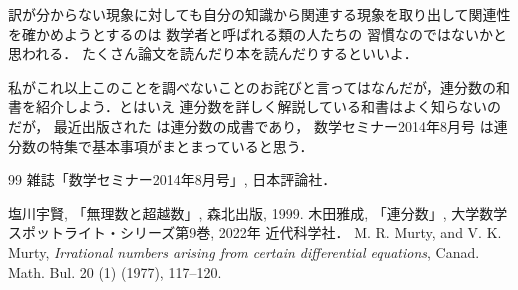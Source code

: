 \documentclass[leqno, a4paper, 12pt]{jsarticle}
\begin{document}
訳が分からない現象に対しても自分の知識から関連する現象を取り出して関連性を確かめようとするのは
数学者と呼ばれる類の人たちの
習慣なのではないかと思われる．
たくさん論文を読んだり本を読んだりするといいよ．

私がこれ以上このことを調べないことのお詫びと言ってはなんだが，連分数の和書を紹介しよう．とはいえ
連分数を詳しく解説している和書はよく知らないのだが，
最近出版された
\cite{kind}は連分数の成書であり，
数学セミナー2014年8月号\cite{sem}
は連分数の特集で基本事項がまとまっていると思う．


\begin{thebibliography}{99}
雑誌「数学セミナー2014年8月号」, 日本評論社．

塩川宇賢, 
「無理数と超越数」, 
森北出版, 
1999. 
木田雅成, 
 「連分数」, 
 大学数学スポットライト・シリーズ第9巻, 
 2022年
 近代科学社．
M. R. Murty, and 
V. K. Murty, 
\textit{Irrational numbers arising from certain differential equations}, 
Canad. Math. Bul. 20 (1) (1977), 117--120. 
\end{thebibliography}
\end{document}
